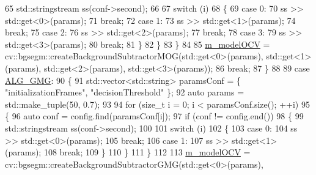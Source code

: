 \begin{DoxyCode}
65                     std::stringstream ss(conf->second);
66 
67                     \textcolor{keywordflow}{switch} (i)
68                     \{
69                     \textcolor{keywordflow}{case} 0:
70                         ss >> std::get<0>(params);
71                         \textcolor{keywordflow}{break};
72                     \textcolor{keywordflow}{case} 1:
73                         ss >> std::get<1>(params);
74                         \textcolor{keywordflow}{break};
75                     \textcolor{keywordflow}{case} 2:
76                         ss >> std::get<2>(params);
77                         \textcolor{keywordflow}{break};
78                     \textcolor{keywordflow}{case} 3:
79                         ss >> std::get<3>(params);
80                         \textcolor{keywordflow}{break};
81                     \}
82                 \}
83             \}
84 
85             \mbox{\hyperlink{class_background_subtract_a80782a38138a430437095f625603e599}{m\_modelOCV}} = cv::bgsegm::createBackgroundSubtractorMOG(std::get<0>(params), 
      std::get<1>(params), std::get<2>(params), std::get<3>(params));
86             \textcolor{keywordflow}{break};
87         \}
88 
89         \textcolor{keywordflow}{case} \mbox{\hyperlink{class_background_subtract_a56850081696df68b55f87b4f3d87949fa3d46f57cfb0a9b1b5b037b387a35f652}{ALG\_GMG}}:
90         \{
91             std::vector<std::string> paramsConf = \{ \textcolor{stringliteral}{"initializationFrames"}, \textcolor{stringliteral}{"decisionThreshold"} \};
92             \textcolor{keyword}{auto} params = std::make\_tuple(50, 0.7);
93 
94             \textcolor{keywordflow}{for} (\textcolor{keywordtype}{size\_t} i = 0; i < paramsConf.size(); ++i)
95             \{
96                 \textcolor{keyword}{auto} conf = config.find(paramsConf[i]);
97                 \textcolor{keywordflow}{if} (conf != config.end())
98                 \{
99                     std::stringstream ss(conf->second);
100 
101                     \textcolor{keywordflow}{switch} (i)
102                     \{
103                     \textcolor{keywordflow}{case} 0:
104                         ss >> std::get<0>(params);
105                         \textcolor{keywordflow}{break};
106                     \textcolor{keywordflow}{case} 1:
107                         ss >> std::get<1>(params);
108                         \textcolor{keywordflow}{break};
109                     \}
110                 \}
111             \}
112 
113             \mbox{\hyperlink{class_background_subtract_a80782a38138a430437095f625603e599}{m\_modelOCV}} = cv::bgsegm::createBackgroundSubtractorGMG(std::get<0>(params), 

\end{DoxyCode}
